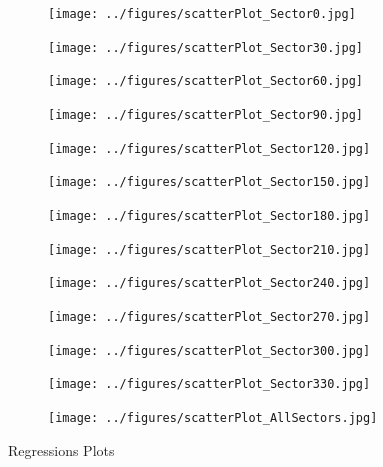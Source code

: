 \documentclass[10pt]{article}
\begin{document}
\begin{figure}[H]
\begin{subfigure}{0.3\textwidth}
  \centering
  \texttt{[image: ../figures/scatterPlot\_Sector0.jpg]}
\end{subfigure}
\begin{subfigure}{0.3\textwidth}
  \centering
  \texttt{[image: ../figures/scatterPlot\_Sector30.jpg]}
\end{subfigure}
\begin{subfigure}{0.3\textwidth}
  \centering
  \texttt{[image: ../figures/scatterPlot\_Sector60.jpg]}
\end{subfigure}
\begin{subfigure}{0.3\textwidth}
  \centering
  \texttt{[image: ../figures/scatterPlot\_Sector90.jpg]}
\end{subfigure}
\begin{subfigure}{0.3\textwidth}
  \centering
  \texttt{[image: ../figures/scatterPlot\_Sector120.jpg]}
\end{subfigure}
\begin{subfigure}{0.3\textwidth}
  \centering
  \texttt{[image: ../figures/scatterPlot\_Sector150.jpg]}
\end{subfigure}
\begin{subfigure}{0.3\textwidth}
  \centering
  \texttt{[image: ../figures/scatterPlot\_Sector180.jpg]}
\end{subfigure}
\begin{subfigure}{0.3\textwidth}
  \centering
  \texttt{[image: ../figures/scatterPlot\_Sector210.jpg]}
\end{subfigure}
\begin{subfigure}{0.3\textwidth}
  \centering
  \texttt{[image: ../figures/scatterPlot\_Sector240.jpg]}
\end{subfigure}
\begin{subfigure}{0.3\textwidth}
  \centering
  \texttt{[image: ../figures/scatterPlot\_Sector270.jpg]}
\end{subfigure}
\begin{subfigure}{0.3\textwidth}
  \centering
  \texttt{[image: ../figures/scatterPlot\_Sector300.jpg]}
\end{subfigure}
\begin{subfigure}{0.3\textwidth}
  \centering
  \texttt{[image: ../figures/scatterPlot\_Sector330.jpg]}
\end{subfigure}
\begin{subfigure}{0.3\textwidth}
  \centering
  \texttt{[image: ../figures/scatterPlot\_AllSectors.jpg]}
\end{subfigure}
  \caption{Regressions Plots}
\label{fig:Regression}
\end{figure}
\end{document}
